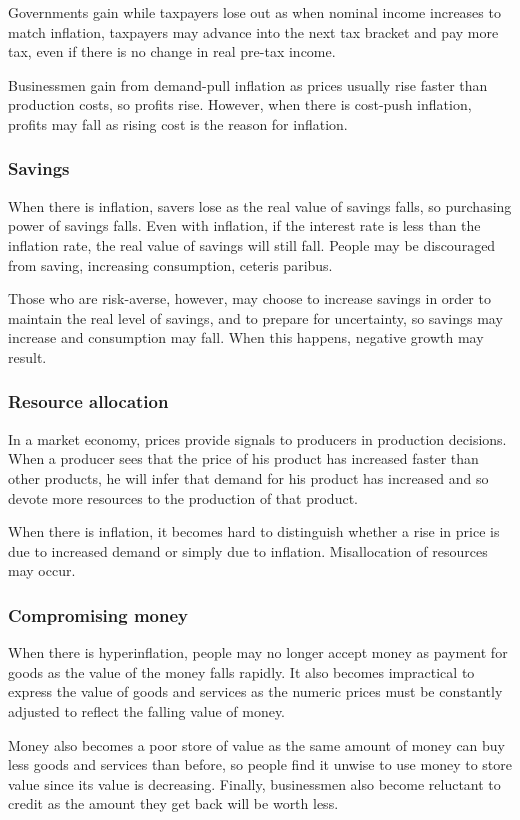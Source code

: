 \documentclass[Economics.tex]{subfiles}
\begin{document}
Governments gain while taxpayers lose out as when nominal income increases to match inflation, taxpayers may advance into the next tax bracket and pay more tax, even if there is no change in real pre-tax income.

Businessmen gain from demand-pull inflation as prices usually rise faster than production costs, so profits rise. However, when there is cost-push inflation, profits may fall as rising cost is the reason for inflation.
\subsubsection{Savings}
When there is inflation, savers lose as the real value of savings falls, so purchasing power of savings falls. Even with inflation, if the interest rate is less than the inflation rate, the real value of savings will still fall. People may be discouraged from saving, increasing consumption, ceteris paribus.

Those who are risk-averse, however, may choose to increase savings in order to maintain the real level of savings, and to prepare for uncertainty, so savings may increase and consumption may fall. When this happens, negative growth may result.
\subsubsection{Resource allocation}
In a market economy, prices provide signals to producers in production decisions. When a producer sees that the price of his product has increased faster than other products, he will infer that demand for his product has increased and so devote more resources to the production of that product.

When there is inflation, it becomes hard to distinguish whether a rise in price is due to increased demand or simply due to inflation. Misallocation of resources may occur.
\subsubsection{Compromising money}
When there is hyperinflation, people may no longer accept money as payment for goods as the value of the money falls rapidly. It also becomes impractical to express the value of goods and services as the numeric prices must be constantly adjusted to reflect the falling value of money.

Money also becomes a poor store of value as the same amount of money can buy less goods and services than before, so people find it unwise to use money to store value since its value is decreasing. Finally, businessmen also become reluctant to credit as the amount they get back will be worth less.
\end{document}
